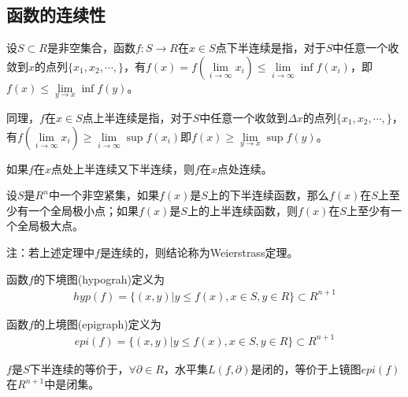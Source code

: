     \subsection{函数的连续性}
        \begin{definition}[下半连续]
        设$S\subset R$是非空集合，函数$f:S\to R$在$x\in S$点下半连续是指，对于$S$中任意一个收敛到$x$的点列$\{x_1,x_2,\cdots,\}$，有$f(x)=f(\mathop{\lim}\limits_{i\to \infty}x_i)\leqslant \mathop{\lim}\limits_{i\to \infty}{\inf}f(x_i)$，即$f(x)\leqslant \mathop{\lim}\limits_{y\to x}{\inf}f(y)$。
        \end{definition}
        \begin{definition}[上半连续]
        同理，$f$在$x\in S$点上半连续是指，对于$S$中任意一个收敛到$\Delta x$的点列$\{x_1,x_2,\cdots,\}$，有$f(\mathop{\lim}\limits_{i\to \infty}x_i)\geqslant \mathop{\lim}\limits_{i\to \infty}{\sup}f(x_i)$即$f(x)\geqslant \mathop{\lim}\limits_{y\to x}{\sup}f(y)$。
        \end{definition}
        \begin{definition}[连续]
        如果$f$在$x$点处上半连续又下半连续，则$f$在$x$点处连续。
        \end{definition}
        \begin{theorem}
        设$S$是$R^n$中一个非空紧集，如果$f(x)$是$S$上的下半连续函数，那么$f(x)$在$S$上至少有一个全局极小点；如果$f(x)$是$S$上的上半连续函数，则$f(x)$在$S$上至少有一个全局极大点。
        \end{theorem}
        注：若上述定理中$f$是连续的，则结论称为Weierstrass定理。
        \begin{definition}[函数的下境图]
        函数$f$的下境图(hypograh)定义为
        \begin{align*}
        hyp(f) = \{(x,y)|y\leqslant f(x),x\in S,y\in R\}\subset R^{n+1}
        \end{align*}
        \end{definition}
        \begin{definition}[函数的上境图]
        函数$f$的上境图(epigraph)定义为
        \begin{align*}
        epi(f) = \{(x,y)|y\leqslant f(x),x\in S,y\in R\}\subset R^{n+1}
        \end{align*}
        \end{definition}
        \begin{theorem}
        $f$是$S$下半连续的等价于，$\forall \partial \in R$，水平集$L(f,\partial)$是闭的，等价于上镜图$epi(f)$在$R^{n+1}$中是闭集。
        \end{theorem}
